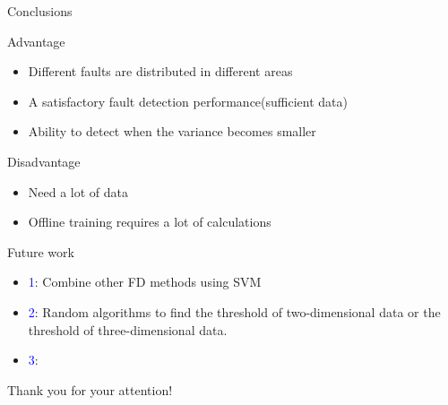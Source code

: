 \documentclass[10pt]{beamer}
\begin{document}
\begin{frame}{Conclusions}
    \begin{exampleblock}{Advantage}
	\begin{itemize}
    \item Different faults are distributed in different areas
    \item A satisfactory fault detection performance(sufficient data)
    \item Ability to detect when the variance becomes smaller
    \end{itemize}
    \end{exampleblock}
    
    \begin{exampleblock}{Disadvantage}
	\begin{itemize}
    \item Need a lot of data
    \item Offline training requires a lot of calculations
    \end{itemize}
    \end{exampleblock}
\end{frame}
\begin{frame}{Future work}
      \begin{itemize}
      \item \textcolor{blue}{1}: Combine other FD methods using SVM
      \item \textcolor{blue}{2}: Random algorithms to find the threshold of two-dimensional data or the threshold of three-dimensional data.
      \item \textcolor{blue}{3}: 
 	 \end{itemize}  
\end{frame}

\begin{frame}[standout]
\begin{center}
Thank you for your attention!
\end{center}
\end{frame}
\end{document}
